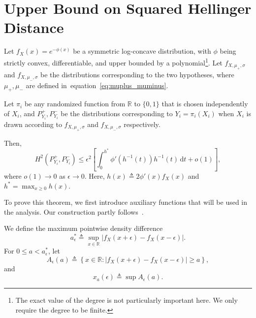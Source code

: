\documentclass[10pt]{article} %
\def\eqref#1{equation~\ref{#1}}
\theoremstyle{plain}
\theoremstyle{definition}
\theoremstyle{remark}
\newcommand{\bR}{\mathbb R}
\newcommand{\dx}{\mathrm{d}}
\begin{document}
\section{Upper Bound on Squared Hellinger Distance}
\begin{theorem}\label{thm:final_hellinger_bound}
    Let $f_X(x)=e^{-\phi(x)}$ be a symmetric log-concave distribution, with $\phi$ being strictly convex, differentiable, and upper bounded by a polynomial\footnote{The exact value of the degree is not particularly important here. We only require the degree to be finite.}. Let $f_{X,\mu_+,\sigma}$ and $f_{X,\mu_-,\sigma}$ be the distributions corresponding to the two hypotheses, where $\mu_+,\mu_-$ are defined in~\eqref{eq:muplus_muminus}. 
    
    Let 
    $\pi_i$ be any randomized function from $\bR$ to $\{0,1\}$ that is chosen independently of $X_i$, and $P_{Y_i}^+,P_{Y_i}^-$ be the distributions corresponding to $Y_i=\pi_i(X_i)$ when $X_i$ is drawn according to $f_{X,\mu_+,\sigma}$ and $f_{X,\mu_-,\sigma}$ respectively.
    
    Then,
    \[
    H^2(P_{Y_i}^+, P_{Y_i}^-) \leq \epsilon^2 \left[ \int_{0}^{h^*} \phi' \left(h^{-1}(t)\right) h^{-1}(t) \, \dx t + o(1) \right],
    \]
    where $o(1)\to 0$ as $\epsilon\to 0$. Here, $h(x)\triangleq 2\phi'(x)f_X(x)$ and $h^*=\max_{x\geq 0} h(x)$.
\end{theorem}

To prove this theorem, we first introduce auxiliary functions that will be used in the analysis.  
Our construction partly follows~\citep{cai2022adaptive}.  


We define the maximum pointwise density difference
\begin{equation}
a_{\epsilon}^{*} \triangleq \sup_{x \in \bR} \left| f_X(x + \epsilon) - f_X(x - \epsilon) \right|.
\label{eq:definition_a*}
\end{equation}
For \(0 \leq a < a_{\epsilon}^*\), let
\begin{equation}
A_{\epsilon}(a) \triangleq \left\{ x \in \bR : \left| f_X(x + \epsilon) - f_X(x - \epsilon) \right| \geq a \right\}, 
\label{eq:defintion_set_A(a)}
\end{equation}
and
\begin{equation}
    x_a(\epsilon) \triangleq \sup A_{\epsilon}(a).\label{eq:defn_xa}
\end{equation}
\end{document}
